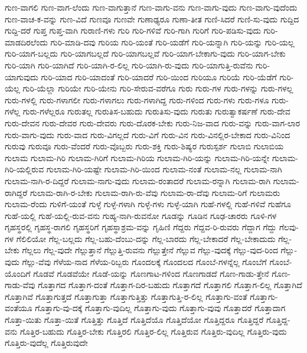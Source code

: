 {ಗುಣ-ವಾಗಲಿ
ಗುಣ-ವಾಗ-ಲೆಂದು
ಗುಣ-ವಾಗುತ್ತಾನೆ
ಗುಣ-ವಾಗು-ವನು
ಗುಣ-ವಾಗು-ವುದು
ಗುಣ-ವಾಗು-ವುದೆಂದು
ಗುಣ-ವಾಚ-ಕ-ವನ್ನು
ಗುಣ-ವಿದೆ
ಗುಣವೂ
ಗುಣವೇ
ಗುಣಾಢ್ಯರೂ
ಗುಣಾ-ತೀತ
ಗುಣಿ-ಸಿದರೆ
ಗುಣಿ-ಸು-ವುದು
ಗುದ್ದಿದ
ಗುದ್ದಿ-ದರೆ
ಗುಪ್ತ
ಗುಪ್ತ-ವಾಗಿ
ಗುರಾಣಿ-ಗಳು
ಗುರಿ
ಗುರಿ-ಗಳಿವೆ
ಗುರಿ-ಗಾಗಿ
ಗುರಿಗೆ
ಗುರಿ-ಪಡಿಸು-ವುದು
ಗುರಿ-ಮಾಡದಿರಲೆಂದು
ಗುರಿ-ಮಾಡಿ-ದವು
ಗುರಿಯ
ಗುರಿ-ಯಂತೆ
ಗುರಿ-ಯಡೆಗೆ
ಗುರಿ-ಯನ್ನಾಗಿ
ಗುರಿ-ಯನ್ನು
ಗುರಿ-ಯಲ್ಲ
ಗುರಿ-ಯಾಗ-ಬಲ್ಲದು
ಗುರಿ-ಯಾಗಬಲ್ಲದೆ
ಗುರಿ-ಯಾಗಬಲ್ಲವೆ
ಗುರಿ-ಯಾಗ-ಬೇಕಾಗು-ವುದು
ಗುರಿ-ಯಾಗ-ಬೇಕು
ಗುರಿ-ಯಾಗಿ
ಗುರಿ-ಯಾಗಿದೆ
ಗುರಿ-ಯಾಗಿ-ರ-ಲಿಲ್ಲ
ಗುರಿ-ಯಾಗಿ-ರು-ವುದು
ಗುರಿ-ಯಾಗುತ್ತಿ-ರುವೆನು
ಗುರಿ-ಯಾಗುವುದು
ಗುರಿ-ಯಾದ
ಗುರಿ-ಯಾದಂತೆ
ಗುರಿ-ಯಾದರೆ
ಗುರಿ-ಯಿಂದ
ಗುರಿಯೂ
ಗುರಿಯೆ
ಗುರಿ-ಯೆಡೆಗೆ
ಗುರಿ-ಯೆಲ್ಲ
ಗುರಿ-ಯೆಲ್ಲಾ
ಗುರಿಯೇ
ಗುರಿ-ಯೇನು
ಗುರಿ-ಸೇರುವ-ವರೆಗೂ
ಗುರು
ಗುರು-ಗಳ
ಗುರು-ಗಳನ್ನು
ಗುರು-ಗಳಲ್ಲ
ಗುರು-ಗಳಲ್ಲಿ
ಗುರು-ಗಳಾಗಲೀ
ಗುರು-ಗಳಾಗಲು
ಗುರು-ಗಳಾಗಿದ್ದ
ಗುರು-ಗಳಿಂದ
ಗುರು-ಗಳು
ಗುರು-ಗಳೂ
ಗುರು-ಗಳೆಲ್ಲ
ಗುರು-ಗಳೆಲ್ಲರೂ
ಗುರುತಲ್ಲ
ಗುರುತಿಸ-ಬಹುದು
ಗುರುತಿಸು-ವುದು
ಗುರುತು
ಗುರುತ್ವಾಕರ್ಷಣೆ
ಗುರು-ದೇವ
ಗುರು-ದೇವನ
ಗುರು-ದೇವರ
ಗುರು-ದೇವರು
ಗುರು-ದೊರಕ-ಬೇಕು
ಗುರು-ನಿಜ-ವಾದ
ಗುರು-ವನ್ನು
ಗುರು-ವಾಗ-ಲಾರ
ಗುರು-ವಾಗು-ವುದು
ಗುರು-ವಾದ
ಗುರು-ವಿಗಲ್ಲದೆ
ಗುರು-ವಿಗೆ
ಗುರು-ವಿನ
ಗುರು-ವಿನಲ್ಲಿರ-ಬೇಕಾದ
ಗುರು-ವಿನಿಂದ
ಗುರುವು
ಗುರುವೂ
ಗುರು-ವೆಂದರೆ
ಗುರು-ವೊಬ್ಬರು
ಗುರು-ಶಕ್ತಿ
ಗುರು-ಶಿಷ್ಯರ
ಗುರುಸ್ಪರ್ಶ
ಗುಲಾಬಿ
ಗುಲಾಬಿಯ
ಗುಲಾಮ
ಗುಲಾಮ-ಗಿರಿ
ಗುಲಾಮ-ಗಿರಿಗೆ
ಗುಲಾಮ-ಗಿರಿಯ
ಗುಲಾಮ-ಗಿರಿ-ಯನ್ನು
ಗುಲಾಮ-ಗಿರಿ-ಯನ್ನೇ
ಗುಲಾಮ-ಗಿರಿ-ಯಲ್ಲಿರುವ
ಗುಲಾಮ-ಗಿರಿ-ಯಷ್ಟೇ
ಗುಲಾಮ-ಗಿರಿ-ಯಿಂದ
ಗುಲಾಮ-ನಂತೆ
ಗುಲಾಮ-ನಲ್ಲ
ಗುಲಾಮ-ನಾಗಿ
ಗುಲಾಮ-ನಾಗಿ-ರ-ದಿದ್ದರೆ
ಗುಲಾಮ-ನಾಗು-ವುದು
ಗುಲಾಮ-ರಂತಾದರೆ
ಗುಲಾಮ-ರನ್ನಾಗಿ
ಗುಲಾಮ-ರಾಗಿ
ಗುಲಾಮ-ರಾಗಿದ್ದರೆ
ಗುಲಾಮ-ರಾಗಿ-ರ-ಬೇಕು
ಗುಲಾಮ-ರಾಗಿ-ರು-ವೆವು
ಗುಲಾಮ-ರಾ-ದೆವು
ಗುಲಾಮ-ರಿಗೆ
ಗುಲಾಮರು
ಗುಲಾಮ-ರೆಂದು
ಗುಳಿಗೆ-ಯಂತೆ
ಗುಳ್ಳೆ
ಗುಳ್ಳೆ-ಗಳಾಗಿ
ಗುಳ್ಳೆ-ಗಳು
ಗುಳ್ಳೆ-ಯಾಗಿ
ಗುಹೆ-ಗಳಲ್ಲಿ
ಗುಹೆ-ಗಳಿವೆ
ಗುಹೆಗೂ
ಗುಹೆ-ಯಲ್ಲಿ
ಗುಹೆ-ಯಲ್ಲಿ-ರುವ-ವನು
ಗುಹ್ಯ-ನಾಗಿ-ರುವನೋ
ಗೂಡನ್ನು
ಗೂಡಿನ
ಗೂಢ-ಚಾರರು
ಗೂಳಿ-ಗಳ
ಗೃಹಸ್ಥರಲ್ಲಿ
ಗೃಹಸ್ಥ-ರಾಗಲಿ
ಗೃಹಸ್ಥರಿಗೆ
ಗೃಹಸ್ಥಾಶ್ರಮ-ವನ್ನು
ಗೃಹಿಣಿ
ಗೆದ್ದರು
ಗೆದ್ದವ-ರಿ-ರುವರು
ಗೆದ್ದಾಗ
ಗೆದ್ದು
ಗೆಲವು-ಗಳ
ಗೆಲಿಲಿಯೋ
ಗೆಲ್ಲ-ಬಲ್ಲದು
ಗೆಲ್ಲ-ಬಹು-ದೆಂಬು-ದನ್ನು
ಗೆಲ್ಲ-ಬಾರದು
ಗೆಲ್ಲ-ಬೇಕಾದರೆ
ಗೆಲ್ಲ-ಬೇಕಾದುದು
ಗೆಲ್ಲ-ಬೇಕು
ಗೆಲ್ಲಲು
ಗೆಲ್ಲ-ವುದೇ
ಗೆಲ್ಲುತ್ತಾನೆ
ಗೆಲ್ಲುತ್ತಿ-ರುವನು
ಗೆಲ್ಲುತ್ತೇನೆ
ಗೆಲ್ಲುವ
ಗೆಲ್ಲು-ವುದಕ್ಕೆ
ಗೆಲ್ಲು-ವುದ-ರಿಂದ
ಗೆಲ್ಲು-ವುದು
ಗೆಲ್ಲು-ವೆವು
ಗೆಳೆಯ-ನಾದ
ಗೆಳೆಯ-ರಿಬ್ಬರು
ಗೊಂದಲಕ್ಕೆ
ಗೊಂದಲದ
ಗೊಂಬೆ-ಗಳನ್ನೆಲ್ಲ
ಗೊಂಬೆಗೆ
ಗೊಂಬೆ-ಯೊಂದಿಗೆ
ಗೊಡವೆ
ಗೊಡವೆಯೇ
ಗೊಡೆ-ಯನ್ನು
ಗೊಣಗಾಟ-ಗಳಿಂದ
ಗೊಣಗಾಡದೆ
ಗೊಣ-ಗಾಡು-ತ್ತೇನೆ
ಗೊಣ-ಗಾಡು-ವೆವು
ಗೊತ್ತಾಗದ
ಗೊತ್ತಾಗ-ದಂತೆ
ಗೊತ್ತಾಗ-ದಿರ-ಬಹುದು
ಗೊತ್ತಾಗದೆ
ಗೊತ್ತಾಗಲಿ
ಗೊತ್ತಾಗ-ಲಿಲ್ಲ
ಗೊತ್ತಾಗಿದೆ
ಗೊತ್ತಾಗಿವೆ
ಗೊತ್ತಾಗುತ್ತದೆ
ಗೊತ್ತಾಗುತ್ತಾ
ಗೊತ್ತಾಗುತ್ತಿತ್ತು
ಗೊತ್ತಾಗುತ್ತಿ-ರ-ಲಿಲ್ಲ
ಗೊತ್ತಾಗು-ವಂತೆ
ಗೊತ್ತಾಗು-ವಂತೆಯೂ
ಗೊತ್ತಾಗು-ವು-ದಕ್ಕೆ
ಗೊತ್ತಾಗು-ವುದಿಲ್ಲ
ಗೊತ್ತಾಗು-ವುದು
ಗೊತ್ತಾಗು-ವುವು
ಗೊತ್ತಾದರೆ
ಗೊತ್ತಾದಾಗ
ಗೊತ್ತಾ-ಯಿತು
ಗೊತ್ತಾ-ಯಿತೆ
ಗೊತ್ತಿತ್ತು
ಗೊತ್ತಿದೆ
ಗೊತ್ತಿದೆಯೊ
ಗೊತ್ತಿದೆಯೋ
ಗೊತ್ತಿದ್ದರೂ
ಗೊತ್ತಿದ್ದರೆ
ಗೊತ್ತಿದ್ದ-ವನು
ಗೊತ್ತಿರ-ಬಹುದು
ಗೊತ್ತಿರ-ಬೇಕು
ಗೊತ್ತಿರಲಿ
ಗೊತ್ತಿರ-ಲಿಲ್ಲ
ಗೊತ್ತಿರುವ
ಗೊತ್ತಿರು-ವುದಿಲ್ಲ
ಗೊತ್ತಿರು-ವುದು
ಗೊತ್ತಿರು-ವುದೆಲ್ಲ
ಗೊತ್ತಿರುವುದೇ
}
